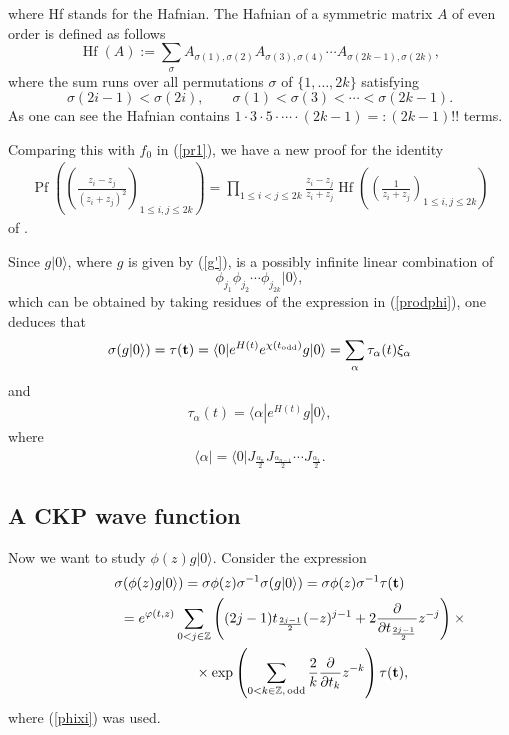 \documentclass[pdftex]{sigma}
\numberwithin{equation}{section}
\newcommand{\Hf}{\mathop\mathrm{Hf}\nolimits}
\newcommand{\Pf}{\mathop\mathrm{Pf}\nolimits}
\begin{document}
where Hf stands for the Hafnian. The Hafnian of  a symmetric
matrix $A$ of even order is def\/ined as follows
\[
\Hf (A) :=\sum_\sigma
 A_{\sigma(1),\sigma(2)}A_{\sigma(3),\sigma(4)}\cdots
A_{\sigma(2k-1),\sigma(2k)} ,
\]
where the sum runs over all permutations $\sigma$ of $\{1,\dots,2k\}$ satisfying
\[
\sigma(2i-1)<\sigma(2i),\qquad\sigma(1)<\sigma(3)<\cdots<\sigma(2k-1).
\]
  As one can see the Hafnian  contains $1\cdot  3\cdot 5\cdot \cdots
  \cdot(2k-1)=:(2k-1)!!$ terms.

\begin{remark}
Comparing this with $f_0$ in (\ref{pr1}), we have a new proof for
the identity
\begin{gather}
\label{pfaffhaf} \Pf\left(\left(
\frac{z_i-{z_j}}{\left(z_i+{z_j}\right)^2} \right)_{1\le i,j\le
2k}\right)= \prod_{1\le i<j\le 2k}\frac{z_i-{z_j}}{z_i+{z_j}}
\Hf\left(\left(\frac{1}{z_i+z_j}\right)_{1\le i,j\le
2k}\right)
\end{gather}
of \cite{IKO}.
\end{remark}


Since $g|0\rangle$, where $g$ is given by (\ref{g'}), is a possibly
inf\/inite linear combination of
\[
\phi_{j_1}\phi_{j_2}\cdots \phi_{j_{2k}}|0\rangle ,
\]
which can be obtained by taking residues of the expression in
(\ref{prodphi}), one deduces that
\begin{gather}
\label{pr7} \sigma(g|0\rangle )=\tau({\bf t})=\langle
0|e^{H(t)}e^{\chi(t_\mathrm{odd})}g|0\rangle = \sum_{\alpha} \tau_\alpha(t)
\xi_{\alpha}
\end{gather}
and
\begin{gather}
\label{pr77} \tau_\alpha(t)=\langle \alpha|e^{H(t)} g|0\rangle ,
\end{gather}
where
\begin{gather}
\label{alpha..} \langle \alpha|=
\langle
0|J_{\frac{\alpha_n}{2}}J_{\frac{\alpha_{n-1}}{2}}
\cdots J_{\frac{\alpha_{1}}{2}} .
\end{gather}



\subsection{A CKP wave function}

Now we want to study $\phi(z)g|0\rangle$. Consider the expression
\begin{gather*}
\sigma(\phi(z)g|0\rangle)= \sigma \phi(z)\sigma^{-1}\sigma(g|0\rangle)
= \sigma \phi(z)\sigma^{-1}\tau({\bf t})\\
\phantom{\sigma(\phi(z)g|0\rangle)}{}
= e^{\varphi(t,z)}
\sum_{0<j\in\mathbb{Z}}\left((2j-1)t_{\frac{2j-1}2}(-z)^{j-1}+2\frac{\partial}{\partial
t_{\frac{2j-1}2}}z^{-j}\right)\times{}
\\
\phantom{\sigma(\phi(z)g|0\rangle)=}{}
\times\exp\left(\sum_{0<k\in\mathbb{Z},\,\mathrm{odd}}\frac{2}{k}\frac{\partial
}{\partial t_k}z^{-k}\right)   \tau({\bf t}) ,
\end{gather*}
where (\ref{phixi}) was used.
\end{document}
